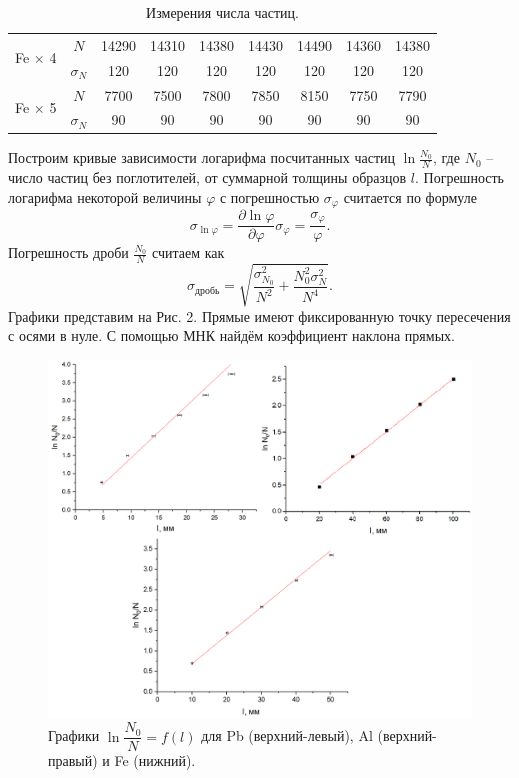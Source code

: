 \documentclass[a4paper,12pt]{article}
\begin{document}
\begin{table}[h!]
\begin{tabular}{|c|c|c|c|c|c|c|c|c|}
\multirow{2}{*}{Fe $\times$ 4} & $N$        & 14290  & 14310  & 14380  & 14430  & 14490  & 14360  & 14380  \\ \cline{2-9} 
                               & $\sigma_N$ & 120    & 120    & 120    & 120    & 120    & 120    & 120    \\ \hline
\multirow{2}{*}{Fe $\times$ 5} & $N$        & 7700   & 7500   & 7800   & 7850   & 8150   & 7750   & 7790   \\ \cline{2-9} 
                               & $\sigma_N$ & 90     & 90     & 90     & 90     & 90     & 90     & 90     \\ \hline
\end{tabular}
\centering
\caption{Измерения числа частиц.}
\end{table}
\newpage
Построим кривые зависимости логарифма посчитанных частиц $\ln \frac{N_0}{N}$, где $N_0$ -- число частиц без поглотителей, от суммарной толщины образцов $l$. Погрешность логарифма некоторой величины $\varphi$ с погрешностью $\sigma_\varphi$ считается по формуле 
\[\sigma_{\ln \varphi} = \dfrac{\partial \ln \varphi}{\partial \varphi} \sigma_\varphi = \dfrac{\sigma_\varphi}{\varphi}.\] 
Погрешность дроби $\frac{N_0}{N}$ считаем как
\[\sigma_{\text{дробь}} = \sqrt{\dfrac{\sigma^2_{N_0}}{N^2} + \dfrac{N_0^2 \sigma_N^2}{N^4}}.\]
Графики представим на Рис. 2. Прямые имеют фиксированную точку пересечения с осями в нуле. С помощью МНК найдём коэффициент наклона прямых.\\
\begin{figure}[h]
\includegraphics[scale=0.5]{3.png}
\centering
\caption{Графики $\ln \dfrac{N_0}{N} = f(l)$ для Pb (верхний-левый), Al (верхний-правый) и Fe (нижний).}
\end{figure}\\
\end{document}
